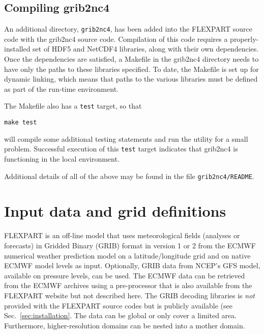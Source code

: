 \documentclass{egu}                  %
\begin{document}
\subsection{Compiling grib2nc4}

An additional directory, \verb|grib2nc4|, has been added into the FLEXPART source code with the grib2nc4 source code. Compilation of this code requires a properly-installed set of HDF5 and NetCDF4 libraries, along with their own dependencies.  Once the dependencies are satisfied, a Makefile in the grib2nc4 directory needs to have only the paths to these libraries specified.  To date, the Makefile is set up for dynamic linking, which means that paths to the various libraries must be defined as part of the run-time environment. 

The Makefile also has a \verb|test| target, so that

\begin{small}
\begin{verbatim}
make test
\end{verbatim}
\end{small}

will compile some additional testing statements and run the utility for a small problem.  Successful execution of this \verb|test| target indicates that grib2nc4 is functioning in the local environment.

Additional details of all of the above may be found in the file \verb|grib2nc4/README|.


\section{Input data and grid definitions}

FLEXPART is an off-line model that uses meteorological fields (analyses or
forecasts) in Gridded Binary (GRIB) format in version 1 or 2 from the ECMWF
numerical weather prediction model \citep{ecmwf1995} on a latitude/longitude
grid and on native ECMWF model levels as input.  Optionally, GRIB data from 
NCEP's GFS model, available on pressure levels, can be used.  The ECMWF data
can be retrieved from the ECMWF archives using a pre-processor that is also
available from the FLEXPART website but not described here.  The GRIB decoding
libraries is {\it not} provided with the FLEXPART source codes but is publicly
available (see Sec.~\ref{sec:installation}.  The data can be global or only
cover a limited area.  Furthermore, higher-resolution domains can be nested
into a mother domain.
\end{document}
